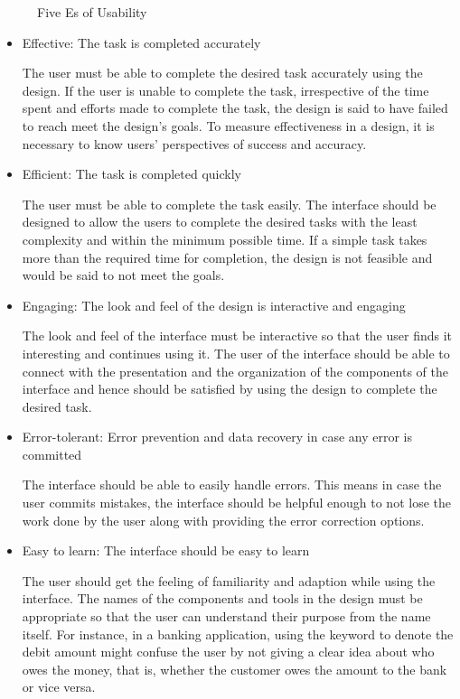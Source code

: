 \begin{doublespace}
\begin{figure}[htp]
    \caption{Five Es of Usability}
    \label{fig:4.1}
\end{figure}
\begin{itemize}
  \item Effective: The task is completed accurately
  \par The user must be able to complete the desired task accurately using the design. If the user is unable to complete the task, irrespective of the time spent and efforts made to complete the task, the design is said to have failed to reach meet the design's goals. To measure effectiveness in a design, it is necessary to know users' perspectives of success and accuracy.
  \item Efficient: The task is completed quickly
  \par The user must be able to complete the task easily. The interface should be designed to allow the users to complete the desired tasks with the least complexity and within the minimum possible time. If a simple task takes more than the required time for completion, the design is not feasible and would be said to not meet the goals.
  \item Engaging: The look and feel of the design is interactive and engaging
  \par The look and feel of the interface must be interactive so that the user finds it interesting and continues using it. The user of the interface should be able to connect with the presentation and the organization of the components of the interface and hence should be satisfied by using the design to complete the desired task.
  \item Error-tolerant: Error prevention and data recovery in case any error is committed
  \par The interface should be able to easily handle errors. This means in case the user commits mistakes, the interface should be helpful enough to not lose the work done by the user along with providing the error correction options.
  \item Easy to learn: The interface should be easy to learn
  \par The user should get the feeling of familiarity and adaption while using the interface. The names of the components and tools in the design must be appropriate so that the user can understand their purpose from the name itself. For instance, in a banking application, using the keyword  to denote the debit amount might confuse the user by not giving a clear idea about who owes the money, that is, whether the customer owes the amount to the bank or vice versa.

\end{itemize}
\end{doublespace}
